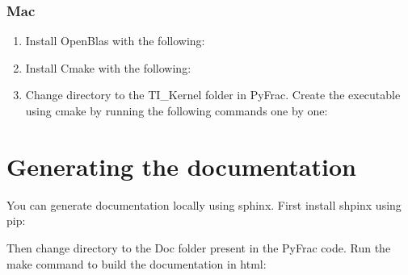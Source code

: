 \documentclass[letterpaper,10pt,english]{sphinxmanual}
\begin{document}
\subsubsection{Mac}
\label{\detokenize{GettingStarted:mac}}\begin{enumerate}
%
\item {} 
\sphinxAtStartPar
Install OpenBlas with the following:

\begin{sphinxVerbatim}[commandchars=\\\{\}]
  
\end{sphinxVerbatim}

\item {} 
\sphinxAtStartPar
Install Cmake with the following:

\begin{sphinxVerbatim}[commandchars=\\\{\}]
  
\end{sphinxVerbatim}

\item {} 
\sphinxAtStartPar
Change directory to the TI\_Kernel folder in PyFrac. Create the executable using cmake by running the following commands one by one:

\begin{sphinxVerbatim}[commandchars=\\\{\}]
 
\end{sphinxVerbatim}

\end{enumerate}


\section{Generating the documentation}
\label{\detokenize{GettingStarted:generating-the-documentation}}
\sphinxAtStartPar
You can generate documentation locally using sphinx. First install shpinx using pip:

\begin{sphinxVerbatim}[commandchars=\\\{\}]
  
\end{sphinxVerbatim}

\sphinxAtStartPar
Then change directory to the Doc folder present in the PyFrac code. Run the make command to build the documentation in html:
\end{document}
